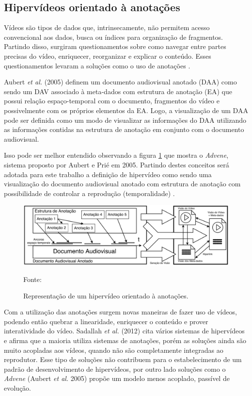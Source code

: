 \subsection{Hipervídeos orientado à anotações}

Vídeos são tipos de dados que, intrinsecamente, não permitem acesso convencional aos dados, busca ou índices para organização de fragmentos. Partindo disso, surgiram questionamentos sobre como navegar entre partes precisas do vídeo, enriquecer, reorganizar e explicar o conteúdo. Esses questionamentos levaram a soluções como o uso de anotações \cite{sadallah2012}.

Aubert \textit{et al.} (2005) definem um documento audiovisual anotado (DAA) como sendo um DAV associado à meta-dados com estrutura de anotação (EA) que possui relação espaço-temporal com o documento, fragmentos do vídeo e possivelmente com os próprios elementos da EA. Logo, a visualização de um DAA pode ser definida como um modo de visualizar as informações do DAA utilizando as informações contidas na estrutura de anotação em conjunto com o documento audiovisual.

Isso pode ser melhor entendido observando a figura \ref{fig:diagram_DAVOA} que mostra o \textit{Advene}, sistema proposto por Aubert e Prié em 2005. Partindo destes conceitos será adotada para este trabalho a definição de hipervídeo como sendo uma visualização do documento audiovisual anotado com estrutura de anotação com possibilidade de controlar a reprodução (temporalidade) \cite{aubert2005}.

\begin{figure}[h!]
	\centering
  	\includegraphics[width=.9\linewidth]{figuras/diagram_DAVOA.eps}
  	\caption{Representação de um hipervídeo orientado à anotações.}
  	\small{Fonte: \cite{sadallah2012}}
  	\label{fig:diagram_DAVOA}
\end{figure}

Com a utilização das anotações surgem novas maneiras de fazer uso de vídeos, podendo então quebrar a linearidade, enriquecer o conteúdo e prover interatividade do vídeo. Sadallah \textit{et al.} (2012) cita vários sistemas de hipervídeos e afirma que a maioria utiliza sistemas de anotações, porém as soluções ainda são muito acopladas aos vídeos, quando não são completamente integradas ao reprodutor. Esse tipo de soluções não contribuem para o estabelecimento de um padrão de desenvolvimento de hipervídeos, por outro lado soluções como o \textit{Advene} (Aubert \textit{et al.} 2005) propõe um modelo menos acoplado, passível de evolução.


